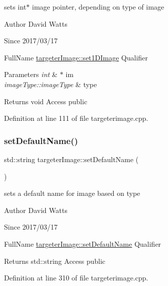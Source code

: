 sets int$\ast$ image pointer, depending on type of image

\begin{DoxyAuthor}{Author}
David Watts 
\end{DoxyAuthor}
\begin{DoxySince}{Since}
2017/03/17
\end{DoxySince}
Full\+Name \hyperlink{classtargeter_image_abcdf64a3dcbb3fc4c9d4a79e9fd658fc}{targeter\+Image\+::set1\+D\+Image} Qualifier 
\begin{DoxyParams}{Parameters}
{\em int} & $\ast$ im \\
\hline
{\em image\+Type\+::image\+Type} & type \\
\hline
\end{DoxyParams}
\begin{DoxyReturn}{Returns}
void Access public 
\end{DoxyReturn}


Definition at line 111 of file targeterimage.\+cpp.

\mbox{\label{classtargeter_image_a47b6c3edc2c1854523e6f14504a64883}} 
\subsubsection{\texorpdfstring{set\+Default\+Name()}{setDefaultName()}}
{\footnotesize\ttfamily std\+::string targeter\+Image\+::set\+Default\+Name (\begin{DoxyParamCaption}{ }\end{DoxyParamCaption})}

sets a default name for image based on type

\begin{DoxyAuthor}{Author}
David Watts 
\end{DoxyAuthor}
\begin{DoxySince}{Since}
2017/03/17
\end{DoxySince}
Full\+Name \hyperlink{classtargeter_image_a47b6c3edc2c1854523e6f14504a64883}{targeter\+Image\+::set\+Default\+Name} Qualifier \begin{DoxyReturn}{Returns}
std\+::string Access public 
\end{DoxyReturn}


Definition at line 310 of file targeterimage.\+cpp.

